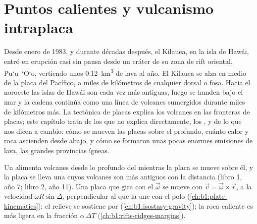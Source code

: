 \chapter{Puntos calientes y vulcanismo intraplaca}\label{ch:b1:hotspots}

Desde enero de 1983, y durante décadas después, el Kilauea, en la isla de Hawái, entró en erupción casi sin pausa desde un cráter de su
zona de rift oriental, Pu\textquoteleft u~\textquoteleft O\textquoteleft o, vertiendo unos \qty{0.12}{km^3} de lava al año. El Kilauea se alza
en medio de la placa del Pacífico, a miles de kilómetros de cualquier dorsal o fosa. Hacia el noroeste las islas de Hawái son cada vez más
antiguas, luego se hunden bajo el mar y la cadena continúa como una línea de volcanes sumergidos durante miles de kilómetros más. La tectónica
de placas explica los volcanes en las fronteras de placas; este capítulo trata de los que no explica directamente, los , y de
lo que nos dicen a cambio: cómo se mueven las placas sobre el  profundo, cuánto calor y roca ascienden desde abajo, y cómo se formaron
unas pocas enormes emisiones de lava, las grandes provincias ígneas.

\begin{recall}
Un  alimenta volcanes desde lo profundo del  mientras la placa se mueve sobre él, y la placa se lleva una  cuyos volcanes son más antiguos con la distancia (libro 1, año 7; libro 2, año 11). Una placa que gira con el 
$\vec\omega$ se mueve con $\vec v = \vec\omega\times\vec r$, a la velocidad $\omega R\sin\Delta$, perpendicular al  que la une con
el polo (\cref{ch:b1:plate-kinematics}); el relieve se sostiene por  (\cref{ch:b1:isostasy-gravity}); la roca caliente es más ligera en la
fracción $\alpha\,\Delta T$ (\cref{ch:b1:rifts-ridges-margins}).
\end{recall}

